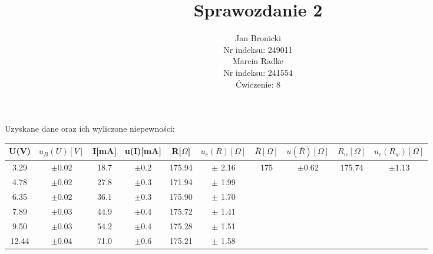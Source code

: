 \documentclass{article}
\title{Sprawozdanie 2}
\author{Jan Bronicki \\
Nr indeksu: 249011\\
Marcin Radke\\
Nr indeksu: 241554\\
Ćwiczenie: 8}
\date{}
\begin{document}
\maketitle
\begin{table}[h]
    Uzyskane dane oraz ich wyliczone niepewności:\\
    \renewcommand{\arraystretch}{1.3}
\begin{tabular}{ |c|c|c|c|c|c|c|c|c|c| }
    \hline
    U(V)&$u_B (U)[V]$&I[mA]&u(I)[mA]&R[$\Omega$]&$u_c(R)[\Omega]$&$\bar{R}[\Omega]$&$u(\bar{R})[\Omega]$&$R_w[\Omega]$&$u_c(R_w)[\Omega]$ \\
    \hline \hline
    3.29&$\pm$0.02&18.7&$\pm$0.2&175.94&$\pm$ 2.16& \multirow{6}{*}{175}&\multirow{6}{*}{$\pm$0.62}&\multirow{6}{*}{175.74}&\multirow{6}{*}{$\pm$1.13}\\ 
    \cline{1-6}

    4.78&$\pm$0.02&27.8&$\pm$0.3&171.94&$\pm$ 1.99&&&&\\ 
    \cline{1-6}
  
    6.35&$\pm$0.02&36.1&$\pm$0.3&175.90&$\pm$ 1.70&&&&\\ 
    \cline{1-6}

    7.89&$\pm$0.03&44.9&$\pm$0.4&175.72&$\pm$ 1.41&&&&\\ 
    \cline{1-6}

    9.50&$\pm$0.03&54.2&$\pm$0.4&175.28&$\pm$ 1.51&&&&\\ 
    \cline{1-6}
    
    12.44&$\pm$0.04&71.0&$\pm$0.6&175.21&$\pm$ 1.58&&&&\\ 

    \hline
\end{tabular}
\label{tabular: t}
\end{table}
\end{document}
